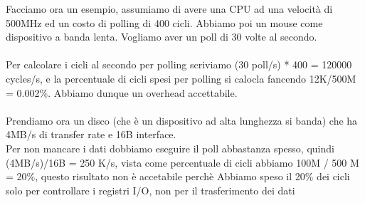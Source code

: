 \begin{example}
    Facciamo ora un esempio, assumiamo di avere una CPU ad una velocità di 500MHz ed un costo di polling di 400 cicli. Abbiamo poi un mouse come dispositivo a banda lenta.
    Vogliamo aver un poll di 30 volte al secondo.\\\\
    Per calcolare i cicli al secondo per polling scriviamo (30 poll/s) * 400 = 120000 cycles/s, e la percentuale di cicli spesi
    per polling si calocla fancendo 12K/500M = 0.002\(\%\). Abbiamo dunque un overhead accettabile.\\\\
    Prendiamo ora un disco (che è un dispositivo ad alta lunghezza si banda) che ha 4MB/s di transfer rate e 16B interface.\\
    Per non mancare i dati dobbiamo eseguire il poll abbastanza spesso, quindi (4MB/s)/16B = 250 K/s, vista come percentuale di cicli
    abbiamo 100M / 500 M = 20\(\%\), questo risultato non è accetabile perchè Abbiamo speso il 20\(\%\) dei cicli solo per controllare i registri I/O, non per il trasferimento dei dati
\end{example}

